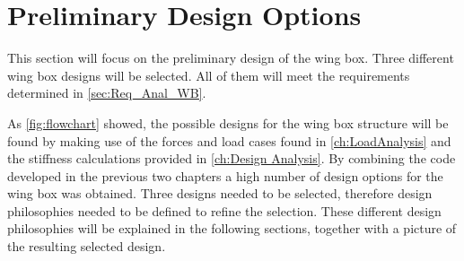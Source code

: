 \section{Preliminary Design Options}
\label{sec:Prelim_Des_Ops}
This section will focus on the preliminary design of the wing box. Three different wing box designs will be selected. All of them will meet the requirements determined in \autoref{sec:Req_Anal_WB}. 

\noindent As \autoref{fig:flowchart} showed, the possible designs for the wing box structure will be found by making use of the forces and load cases found in \autoref{ch:LoadAnalysis} and the stiffness calculations provided in \autoref{ch:Design Analysis}. By combining the code developed in the previous two chapters a high number of design options for the wing box was obtained. Three designs needed to be selected, therefore design philosophies needed to be defined to refine the selection. These different design philosophies will be explained in the following sections, together with a picture of the resulting selected design.





